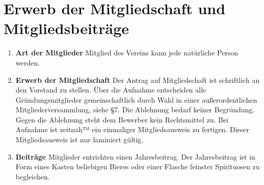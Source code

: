 \documentclass{scrartcl}
\begin{document}
    \section{Erwerb der Mitgliedschaft und Mitgliedsbeiträge}
        \begin{enumerate}
            \item \textbf{Art der Mitglieder} \newline
                Mitglied des Vereins kann jede natürliche Person werden.
            \item \textbf{Erwerb der Mitgliedschaft} \newline
                Der Antrag auf Mitgliedschaft ist schriftlich an den Vorstand zu stellen. 
                Über die Aufnahme entscheiden alle Gründungsmitglieder gemeinschaftlich durch Wahl in einer außerordentlichen Mitgliederversammlung, siehe \S 7.
                Die Ablehnung bedarf keiner Begründung. 
                Gegen die Ablehnung steht dem Bewerber kein Rechtsmittel zu.
                Bei Aufnahme ist zeitnah™ ein einmaliger Mitgliedsausweis zu fertigen. Dieser Mitgliedsausweis ist nur laminiert gültig. 
            \item \textbf{Beiträge} \newline
                Mitglieder entrichten einen Jahresbeitrag. 
                Der Jahresbeitrag ist in Form eines Kasten beliebigen Bieres oder einer Flasche feinster Spirituosen zu begleichen. 
        \end{enumerate}
\end{document}

